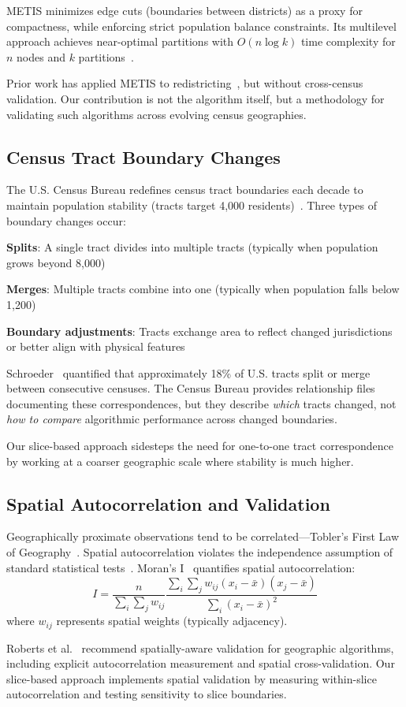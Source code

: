 METIS minimizes edge cuts (boundaries between districts) as a proxy for compactness, while enforcing strict population balance constraints. Its multilevel approach achieves near-optimal partitions with $O(n \log k)$ time complexity for $n$ nodes and $k$ partitions~\cite{karypis1999}.

Prior work has applied METIS to redistricting~\cite{ricca2013}, but without cross-census validation. Our contribution is not the algorithm itself, but a methodology for validating such algorithms across evolving census geographies.

\subsection{Census Tract Boundary Changes}

The U.S. Census Bureau redefines census tract boundaries each decade to maintain population stability (tracts target 4,000 residents)~\cite{census2020tracts}. Three types of boundary changes occur:

\textbf{Splits}: A single tract divides into multiple tracts (typically when population grows beyond 8,000)

\textbf{Merges}: Multiple tracts combine into one (typically when population falls below 1,200)

\textbf{Boundary adjustments}: Tracts exchange area to reflect changed jurisdictions or better align with physical features

Schroeder~\cite{schroeder2007} quantified that approximately 18\% of U.S. tracts split or merge between consecutive censuses. The Census Bureau provides relationship files~\cite{census2020relationships} documenting these correspondences, but they describe \textit{which} tracts changed, not \textit{how to compare} algorithmic performance across changed boundaries.

Our slice-based approach sidesteps the need for one-to-one tract correspondence by working at a coarser geographic scale where stability is much higher.

\subsection{Spatial Autocorrelation and Validation}

Geographically proximate observations tend to be correlated—Tobler's First Law of Geography~\cite{tobler1970}. Spatial autocorrelation violates the independence assumption of standard statistical tests~\cite{legendre1993}. Moran's I~\cite{moran1950} quantifies spatial autocorrelation:
\[
I = \frac{n}{\sum_i \sum_j w_{ij}} \frac{\sum_i \sum_j w_{ij}(x_i - \bar{x})(x_j - \bar{x})}{\sum_i (x_i - \bar{x})^2}
\]
where $w_{ij}$ represents spatial weights (typically adjacency).

Roberts et al.~\cite{roberts2017} recommend spatially-aware validation for geographic algorithms, including explicit autocorrelation measurement and spatial cross-validation. Our slice-based approach implements spatial validation by measuring within-slice autocorrelation and testing sensitivity to slice boundaries.
